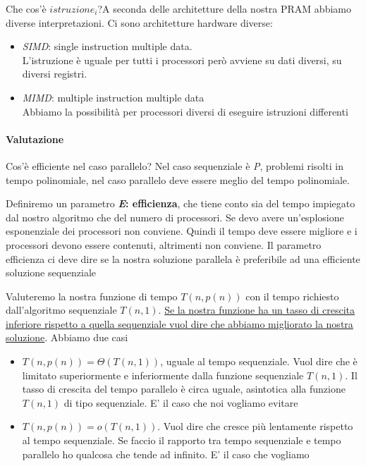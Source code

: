 Che cos'è $istruzione_i$?A seconda delle architetture della nostra PRAM abbiamo diverse interpretazioni. Ci sono architetture hardware diverse:
\begin{itemize}
    \item \textit{SIMD}: single instruction multiple data.\\
    L'istruzione è uguale per tutti i processori però avviene su dati diversi, su diversi registri.
    \item \textit{MIMD}: multiple instruction multiple data\\
    Abbiamo la possibilità per processori diversi di eseguire istruzioni differenti
\end{itemize}


\paragraph{Valutazione}
Cos'è efficiente nel caso parallelo? Nel caso sequenziale è \textit{P}, problemi risolti in tempo polinomiale, nel caso parallelo deve essere meglio del tempo polinomiale.

Definiremo un parametro \textbf{\textit{E}: efficienza}, che tiene conto sia del tempo impiegato dal nostro algoritmo che del numero di processori. Se devo avere un'esplosione esponenziale dei processori non conviene. Quindi il tempo deve essere migliore e i processori devono essere contenuti, altrimenti non conviene. Il parametro efficienza ci deve dire se la nostra soluzione parallela è preferibile ad una efficiente soluzione sequenziale

Valuteremo la nostra funzione di tempo $T(n, p(n))$ con il tempo richiesto dall'algoritmo sequenziale $T(n, 1)$. \uline{Se la nostra funzione ha un tasso di crescita inferiore rispetto a quella sequenziale vuol dire che abbiamo migliorato la nostra soluzione}. 
Abbiamo due casi
\begin{itemize}
    \item $T(n,p(n)) = \Theta (T(n,1))$, uguale al tempo sequenziale. Vuol dire che è limitato superiormente e inferiormente dalla funzione sequenziale $T(n,1)$. Il tasso di crescita del tempo parallelo è circa uguale, asintotica alla funzione $T(n,1)$ di tipo sequenziale. E' il caso che noi vogliamo evitare
    \item $T(n,p(n)) = o(T(n,1))$. Vuol dire che cresce più lentamente rispetto al tempo sequenziale. Se faccio il rapporto tra tempo sequenziale e tempo parallelo ho qualcosa che tende ad infinito. E' il caso che vogliamo
\end{itemize}

